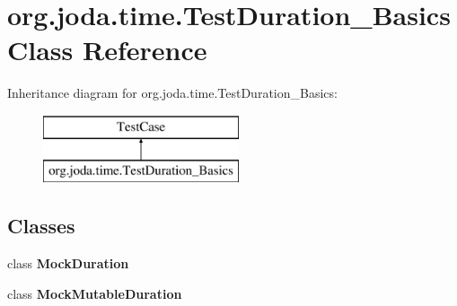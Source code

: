 \hypertarget{classorg_1_1joda_1_1time_1_1_test_duration___basics}{\section{org.\-joda.\-time.\-Test\-Duration\-\_\-\-Basics Class Reference}
\label{classorg_1_1joda_1_1time_1_1_test_duration___basics}
}
Inheritance diagram for org.\-joda.\-time.\-Test\-Duration\-\_\-\-Basics\-:\begin{figure}[H]
\begin{center}
\leavevmode
\includegraphics[height=2.000000cm]{classorg_1_1joda_1_1time_1_1_test_duration___basics}
\end{center}
\end{figure}
\subsection*{Classes}
\begin{DoxyCompactItemize}
\item 
class {\bfseries Mock\-Duration}
\item 
class {\bfseries Mock\-Mutable\-Duration}
\end{DoxyCompactItemize}
